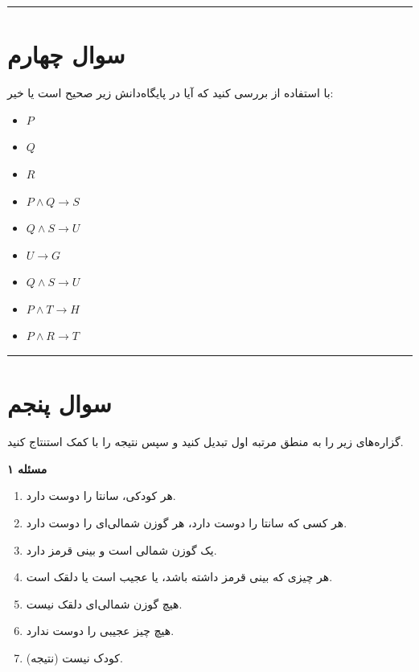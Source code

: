\documentclass[a4paper,10pt]{article}
\begin{document}
\bigskip
\textcolor{AccentCyan}{\rule{\linewidth}{0.4pt}}
\section{\textcolor{AccentGold}{سوال چهارم}}
با استفاده از  بررسی کنید که آیا  در پایگاه‌دانش زیر صحیح است یا خیر:
\begin{latin}
\begin{itemize}
	\item ${P}$
	\item ${Q}$
	\item ${R}$
	\item ${P \land Q \rightarrow S}$
	\item ${Q \land S \rightarrow U}$
	\item ${U \rightarrow G}$
	\item ${Q \land S \rightarrow U}$ %
	\item ${P \land T \rightarrow H}$
	\item ${P \land R \rightarrow T}$
\end{itemize}
\end{latin}

\bigskip
\bigskip
\textcolor{AccentCyan}{\rule{\linewidth}{0.4pt}}
\section{\textcolor{AccentGold}{سوال پنجم}}
گزاره‌های زیر را به منطق مرتبه اول تبدیل کنید و سپس نتیجه را با کمک  استنتاج کنید.

\textbf{مسئله ۱}
\begin{enumerate}
	\item هر کودکی، سانتا را دوست دارد.
	\item هر کسی که سانتا را دوست دارد، هر گوزن شمالی‌ای را دوست دارد.
	\item {} یک گوزن شمالی است و  بینی قرمز دارد.
	\item هر چیزی که بینی قرمز داشته باشد، یا عجیب است یا دلقک است.
	\item هیچ گوزن شمالی‌ای دلقک نیست.
	\item {} هیچ چیز عجیبی را دوست ندارد.
	\item (نتیجه)  کودک نیست.
\end{enumerate}
\end{document}
